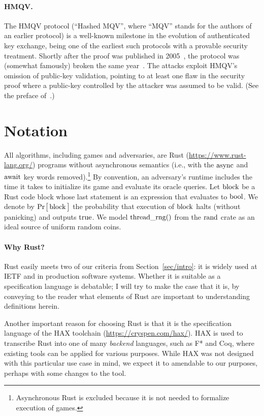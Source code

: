 \documentclass{article}
\newcommand{\Prob}[1]{\Pr\hspace{-1pt}\big[\,#1\,\big]}
\newcommand{\code}[1]{\textrm{\textup{\lstinline{#1}}}}
\begin{document}
\paragraph{HMQV.}
%
The HMQV protocol (``Hashed MQV'', where ``MQV'' stands for the authors of an
earlier protocol) is a well-known milestone in the evolution of authenticated
key exchange, being one of the earliest such protocols with a provable security
treatment.
%
Shortly after the proof was published in 2005~\cite{Kra05}, the protocol was
(somewhat famously) broken the same year~\cite{Men05}.
%
The attacks exploit HMQV's omission of public-key validation, pointing to at
least one flaw in the security proof where a public-key controlled by the
attacker was assumed to be valid. (See the preface of~\cite{Kra05}.)


\section{Notation}\label{sec/notation}

All algorithms, including games and adversaries, are Rust
(\url{https://www.rust-lang.org/}) programs without asynchronous semantics
(i.e., with the $\code{async}$ and $\code{await}$ key words
removed).\footnote{Asynchronous Rust is excluded because it is not needed to
formalize execution of games.}
%
By convention, an adversary's runtime includes the time it takes to initialize
its game and evaluate its oracle queries.
%
Let $\code{block}$ be a Rust code block whose last statement is an expression
that evaluates to $\code{bool}$.
%
We denote by $\Prob{\code{block}}$ the probability that execution of
$\code{block}$ halts (without panicking) and outputs $\code{true}$.
%
We model
\href{https://rust-random.github.io/rand/rand/fn.thread_rng.html}{$\code{thread_rng()}$}
from the
\href{https://rust-random.github.io/rand/rand/index.html}{$\code{rand}$} crate
as an ideal source of uniform random coins.

\paragraph{Why Rust?}
%
Rust easily meets two of our criteria from Section~\ref{sec/intro}: it is
widely used at IETF and in production software systems.
%
Whether it is suitable as a specification language is debatable; I will try to
make the case that it is, by conveying to the reader what elements of Rust are
important to understanding definitions herein.

Another important reason for choosing Rust is that it is the specification
language of the HAX toolchain (\url{https://cryspen.com/hax/}).
%
HAX is used to transcribe Rust into one of many \emph{backend} languages, such
as F* and Coq, where existing tools can be applied for various purposes.
%
While HAX was not designed with this particular use case in mind, we expect it
to amendable to our purposes, perhaps with some changes to the tool.
\end{document}
